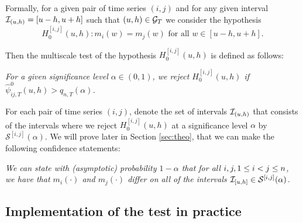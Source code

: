 \documentclass[a4paper,12pt]{article}
\begin{document}
Formally, for a given pair of time series $(i, j)$ and for any given interval \linebreak $\mathcal{I}_{(u, h)} = [u-h, u+h]$ such that $(u, h) \in \mathcal{G}_T$ we consider the hypothesis 
\[ H_0^{[i,j]}(u,h): m_i(w) = m_j(w) \text{ for all } w \in [u-h,u+h]. \] 

Then the multiscale test of the hypothesis $H_0^{[i,j]}(u,h)$ is defined as follows: 
\begin{center}
\begin{minipage}[c][1.25cm][c]{13cm}
\textit{For a given significance level $\alpha \in (0,1)$, we reject $H_0^{[i,j]}(u,h)$ if $\hat{\psi}^0_{ij,T}(u, h) > q_{n,T}(\alpha)$.}
\end{minipage}
\end{center}

For each pair of time series $(i, j)$, denote the set of intervals $\mathcal{I}_{(u, h)}$ that consists of the intervals where we reject $H_0^{[i,j]}(u,h)$ at a significance level $\alpha$ by $\mathcal{S}^{[i, j]}(\alpha)$. We will prove later in Section \ref{sec:theo}, that we can make the following confidence statements:
\begin{center}
\begin{minipage}[c][1.25cm][c]{13cm}
\textit{We can state with (asymptotic) probability $1-\alpha$ that for all $i, j, \linebreak1\leq i < j \leq n$, we have that $m_i(\cdot)$ and $m_j(\cdot)$ differ on all of the intervals $\mathcal{I}_{[u, h]} \in \mathcal{S}^{[i, j]}(\alpha)$.}
\end{minipage}
\end{center}


\subsection{Implementation of the test in practice}\label{subsec:test:impl}
\end{document}
